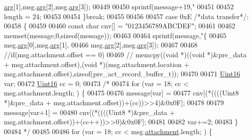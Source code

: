 \begin{DoxyCode}
{{{      \hyperlink{a00029_af7d6f762438c80072bd9dc0e4dd4ae1e}{arg}[1],msg.\hyperlink{a00029_af7d6f762438c80072bd9dc0e4dd4ae1e}{arg}[2],msg.\hyperlink{a00029_af7d6f762438c80072bd9dc0e4dd4ae1e}{arg}[3]);
00449 
00450        sprintf(message+19,\textcolor{stringliteral}{"%
00451 
00452        length = 24;
00453 
00454        \}\textcolor{keywordflow}{break};
00455 
00456 
00457        \textcolor{keywordflow}{case} 0xE \textcolor{comment}{/*data transfer*/}:
00458        \{
00459 
00460        \textcolor{keyword}{const} \textcolor{keywordtype}{char} cnv[] = \textcolor{stringliteral}{"0123456789ABCDEF"};
00461 
00462        memset(message,0,\textcolor{keyword}{sizeof}(message));
00463 
00464        sprintf(message,\textcolor{stringliteral}{"\{%
00465                                             msg.\hyperlink{a00029_af7d6f762438c80072bd9dc0e4dd4ae1e}{arg}[0],msg.\hyperlink{a00029_af7d6f762438c80072bd9dc0e4dd4ae1e}{arg}[1],
00466                                             msg.\hyperlink{a00029_af7d6f762438c80072bd9dc0e4dd4ae1e}{arg}[2],msg.\hyperlink{a00029_af7d6f762438c80072bd9dc0e4dd4ae1e}{arg}[3]);
00467 
00468        \textcolor{comment}{//if(msg.attachment.offset == 0)}
00469        \textcolor{comment}{//  memcpy((void *)((void *)&pre\_data + msg.attachment.offset),(void *)(msg.attachment.location +
       msg.attachment.offset),sizeof(pre\_act\_record\_buffer\_t));}
00470 
00471        \hyperlink{a00070_a59a9f6be4562c327cbfb4f7e8e18f08b}{Uint16} var;
00472        \hyperlink{a00070_a59a9f6be4562c327cbfb4f7e8e18f08b}{Uint16} cc = 0;
00473 \textcolor{comment}{/*}
00474 \textcolor{comment}{       for (var = 18; cc < msg.attachment.length; ) \{}
00475 \textcolor{comment}{}
00476 \textcolor{comment}{                   message[var]   =}
00477 \textcolor{comment}{                    cnv[(*((((Uint8 *)&pre\_data + msg.attachment.offset))+(cc))>>4)&0x0F];}
00478 \textcolor{comment}{}
00479 \textcolor{comment}{                   message[var+1]   =}
00480 \textcolor{comment}{                    cnv[(*((((Uint8 *)&pre\_data + msg.attachment.offset))+(cc++))>>0)&0x0F];}
00481 \textcolor{comment}{}
00482 \textcolor{comment}{                   var+=2;}
00483 \textcolor{comment}{       \}}
00484 \textcolor{comment}{*/}
00485    
00486        \textcolor{keywordflow}{for} (var = 18; cc < msg.\hyperlink{a00029_a040f6d5d58d18d8aeaf447eda7f50172}{attachment}.length; ) \{
}}}}}
\end{DoxyCode}
